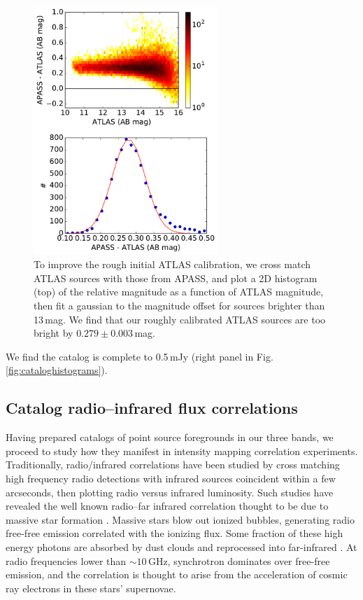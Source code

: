 \documentclass{emulateapj}
\begin{document}
\begin{figure}[t]
\centering
\includegraphics[width=2.75in]{images/ATLAS_vs_APASS_cal.pdf}
\caption{To improve the rough initial ATLAS calibration, we cross match ATLAS sources with those from APASS, and plot a 2D histogram (top) of the relative magnitude as a function of ATLAS magnitude, then fit a gaussian to the magnitude offset for sources brighter than 13\,mag. We find that our roughly calibrated ATLAS sources are too bright by $0.279\pm0.003$\,mag.}
\label{fig:ATLASvsAPASS}
\end{figure}

We find the catalog is complete to 0.5\,mJy (right panel in Fig. \ref{fig:cataloghistograms}). 



\subsection{Catalog radio--infrared flux correlations}
\label{sec:catcorrelations}

Having prepared catalogs of point source foregrounds in our three bands, we proceed to study how they manifest in intensity mapping correlation experiments. Traditionally, radio/infrared correlations have been studied by cross matching high frequency radio detections with infrared sources coincident within a few arcseconds, then plotting radio versus infrared luminosity. Such studies have revealed the well known radio--far infrared correlation thought to be due to massive star formation \citep[e.g.][]{helou85,dejong85,yun01,xu94}. Massive stars blow out ionized bubbles, generating radio free-free emission correlated with the ionizing flux. Some fraction of these high energy photons are absorbed by dust clouds and reprocessed into far-infrared \citep{xu94}. At radio frequencies lower than $\sim10$\,GHz, synchrotron dominates over free-free emission, and the correlation is thought to arise from the acceleration of cosmic ray electrons in these stars' supernovae. 
\end{document}
